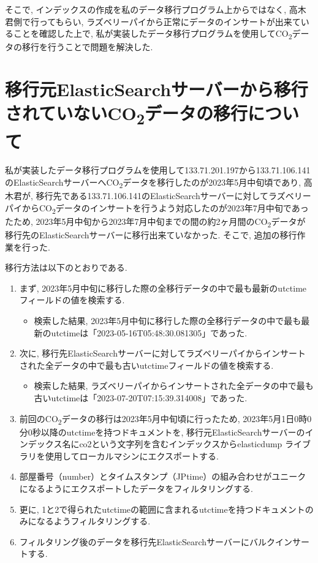 そこで, インデックスの作成を私のデータ移行プログラム上からではなく, 高木君側で行ってもらい, ラズベリーパイから正常にデータのインサートが出来ていることを確認した上で, 私が実装したデータ移行プログラムを使用してCO\textsubscript{2}データの移行を行うことで問題を解決した.

\section{移行元ElasticSearchサーバーから移行されていないCO\textsubscript{2}データの移行について}

私が実装したデータ移行プログラムを使用して133.71.201.197から133.71.106.141のElasticSearchサーバーへCO\textsubscript{2}データを移行したのが2023年5月中旬頃であり, 高木君が, 移行先である133.71.106.141のElasticSearchサーバーに対してラズベリーパイからCO\textsubscript{2}データのインサートを行うよう対応したのが2023年7月中旬であったため, 2023年5月中旬から2023年7月中旬までの間の約2ヶ月間のCO\textsubscript{2}データが移行先のElasticSearchサーバーに移行出来ていなかった. そこで, 追加の移行作業を行った.

移行方法は以下のとおりである.

\begin{enumerate}
    \item まず, 2023年5月中旬に移行した際の全移行データの中で最も最新のutctimeフィールドの値を検索する.
          \begin{itemize}
              \item 検索した結果, 2023年5月中旬に移行した際の全移行データの中で最も最新のutctimeは「2023-05-16T05:48:30.081305」であった.
          \end{itemize}
    \item 次に, 移行先ElasticSearchサーバーに対してラズベリーパイからインサートされた全データの中で最も古いutctimeフィールドの値を検索する.
          \begin{itemize}
              \item 検索した結果, ラズベリーパイからインサートされた全データの中で最も古いutctimeは「2023-07-20T07:15:39.314008」であった.
          \end{itemize}
    \item 前回のCO\textsubscript{2}データの移行は2023年5月中旬頃に行ったため, 2023年5月1日0時0分0秒以降のutctimeを持つドキュメントを, 移行元ElasticSearchサーバーのインデックス名にco2という文字列を含むインデックスからelasticdump \cite{1}ライブラリを使用してローカルマシンにエクスポートする.
    \item 部屋番号（number）とタイムスタンプ（JPtime）の組み合わせがユニークになるようにエクスポートしたデータをフィルタリングする.
    \item 更に, 1と2で得られたutctimeの範囲に含まれるutctimeを持つドキュメントのみになるようフィルタリングする.
    \item フィルタリング後のデータを移行先ElasticSearchサーバーにバルクインサートする.
\end{enumerate}

